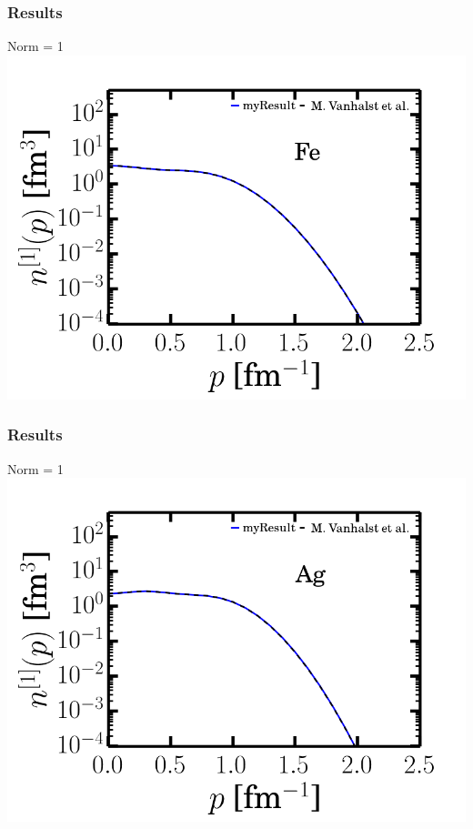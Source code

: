 \documentclass{beamer}
\begin{document}
\begin{frame}
\frametitle{Results}
Norm = 1
\includegraphics[scale=0.5]{Fe_mf.png} 
\end{frame}
\begin{frame}
\frametitle{Results}
Norm = 1
\includegraphics[scale=0.5]{Ag_mf.png} 
\end{frame}
\end{document}

